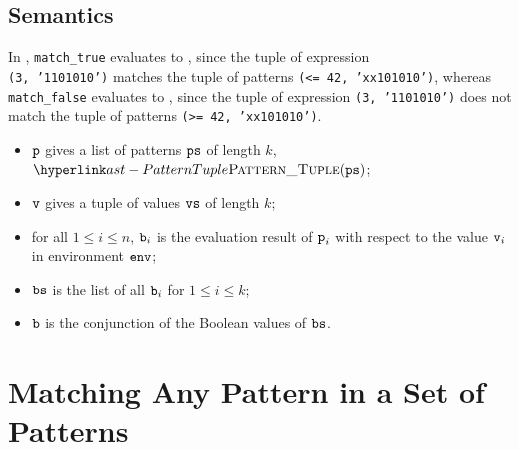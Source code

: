 \subsection{Semantics}
In ,
\texttt{match\_true} evaluates to \True, since
the tuple of expression \\
\texttt{(3, '1101010')} matches the tuple of patterns \texttt{(<= 42, 'xx101010')},
whereas \\
\texttt{match\_false} evaluates to \False, since
the tuple of expression \texttt{(3, '1101010')} does not match the tuple of patterns \texttt{(>= 42, 'xx101010')}.

\ProseParagraph
\AllApply
\begin{itemize}
  \item $\vp$ gives a list of patterns $\vps$ of length $k$, $\PatternTuple(\vps)$;
  \item $\vv$ gives a tuple of values $\vvs$ of length $k$;
  \item for all $1 \leq i \leq n$, $\vb_i$ is the evaluation result
        of $\vp_i$ with respect to the value $\vv_i$ in
        environment $\env$\ProseOrDynErrorDiverging;
  \item $\vbs$ is the list of all $\vb_i$ for $1 \leq i \leq k$;
  \item $\vb$ is the conjunction of the Boolean values of $\vbs$.
\end{itemize}

\FormallyParagraph
\begin{mathpar}
\end{mathpar}

\section{Matching Any Pattern in a Set of Patterns\label{sec:MatchingAnyPatternInASetOfPatterns}}
